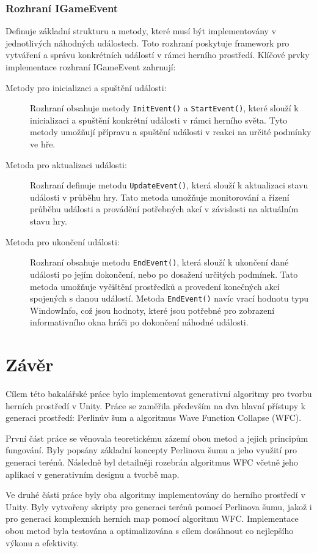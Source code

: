 \subsection{Rozhraní IGameEvent}
Definuje základní strukturu a metody, které musí být implementovány v jednotlivých náhodných událostech. Toto rozhraní poskytuje framework pro vytváření a správu konkrétních událostí v rámci herního prostředí. Klíčové prvky implementace rozhraní IGameEvent zahrnují:
\begin{description}
	\item[Metody pro inicializaci a spuštění události:] Rozhraní obsahuje metody \texttt{InitEvent()} a \texttt{StartEvent()}, které slouží k inicializaci a spuštění konkrétní události v rámci herního světa. Tyto metody umožňují přípravu a spuštění události v reakci na určité podmínky ve hře.
	\item[Metoda pro aktualizaci události:] Rozhraní definuje metodu \texttt{UpdateEvent()}, která slouží k aktualizaci stavu události v průběhu hry. Tato metoda umožňuje monitorování a řízení průběhu události a provádění potřebných akcí v závislosti na aktuálním stavu hry.
	\item[Metoda pro ukončení události:] Rozhraní obsahuje metodu \texttt{EndEvent()}, která slouží k ukončení dané události po jejím dokončení, nebo po dosažení určitých podmínek. Tato metoda umožňuje vyčištění prostředků a provedení konečných akcí spojených s danou událostí. Metoda \texttt{EndEvent()} navíc vrací hodnotu typu WindowInfo, což jsou hodnoty, které jsou potřebné pro zobrazení informativního okna hráči po dokončení náhodné události.
\end{description}

\chapter{Závěr}
Cílem této bakalářské práce bylo implementovat generativní algoritmy pro tvorbu herních prostředí v Unity. Práce se zaměřila především na dva hlavní přístupy k generaci prostředí: Perlinův šum a algoritmus Wave Function Collapse (WFC).

První část práce se věnovala teoretickému zázemí obou metod a jejich principům fungování. Byly popsány základní koncepty Perlinova šumu a jeho využití pro generaci terénů. Následně byl detailněji rozebrán algoritmus WFC včetně jeho aplikací v generativním designu a tvorbě map.

Ve druhé části práce byly oba algoritmy implementovány do herního prostředí v Unity. Byly vytvořeny skripty pro generaci terénů pomocí Perlinova šumu, jakož i pro generaci komplexních herních map pomocí algoritmu WFC. Implementace obou metod byla testována a optimalizována s cílem dosáhnout co nejlepšího výkonu a efektivity.

